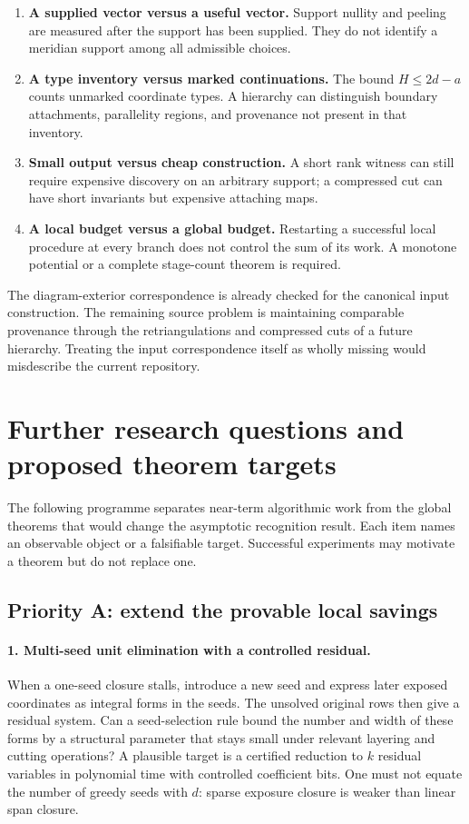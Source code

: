 \begin{enumerate}
\item \textbf{A supplied vector versus a useful vector.}  Support nullity and
peeling are measured after the support has been supplied.  They do not identify
a meridian support among all admissible choices.
\item \textbf{A type inventory versus marked continuations.}  The bound
$H\le2d-a$ counts unmarked coordinate types.  A hierarchy can distinguish
boundary attachments, parallelity regions, and provenance not present in that
inventory.
\item \textbf{Small output versus cheap construction.}  A short rank witness
can still require expensive discovery on an arbitrary support; a compressed
cut can have short invariants but expensive attaching maps.
\item \textbf{A local budget versus a global budget.}  Restarting a successful
local procedure at every branch does not control the sum of its work.  A
monotone potential or a complete stage-count theorem is required.
\end{enumerate}

The diagram-exterior correspondence is already checked for the canonical
input construction.  The remaining source problem is maintaining comparable
provenance through the retriangulations and compressed cuts of a future
hierarchy.  Treating the input correspondence itself as wholly missing would
misdescribe the current repository.

\section{Further research questions and proposed theorem targets}
\label{sec:agenda}

The following programme separates near-term algorithmic work from the global
theorems that would change the asymptotic recognition result.  Each item names
an observable object or a falsifiable target.  Successful experiments may
motivate a theorem but do not replace one.

\subsection{Priority A: extend the provable local savings}

\paragraph{1. Multi-seed unit elimination with a controlled residual.}
When a one-seed closure stalls, introduce a new seed and express later exposed
coordinates as integral forms in the seeds.  The unsolved original rows then
give a residual system.  Can a seed-selection rule bound the number and width
of these forms by a structural parameter that stays small under relevant
layering and cutting operations?  A plausible target is a certified reduction
to $k$ residual variables in polynomial time with controlled coefficient bits.
One must not equate the number of greedy seeds with $d$: sparse exposure
closure is weaker than linear span closure.

